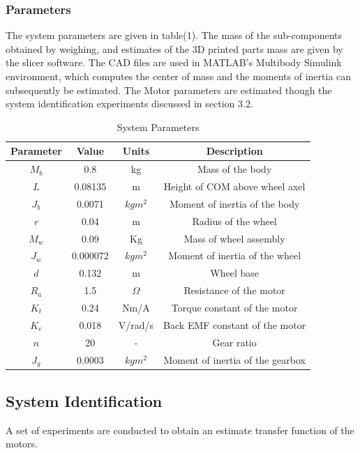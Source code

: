         \subsubsection{Parameters }
        The system parameters are given in table(1). 
        The mass of the sub-components obtained by weighing,
        and estimates of the 3D printed parts mass are given by the slicer software. 
        The CAD files are used in MATLAB's Multibody Simulink environment, which 
        computes the center of mass and the moments of inertia can subsequently be estimated.
        The Motor parameters are estimated though the system identification experiments discussed in section 3.2.
    
        \begin{table} [H]
            \centering
            \begin{tabular}{|c|c|c|c|}
                \hline
                Parameter & Value & Units & Description \\
                \hline
                $M_b$ & 0.8 & kg & Mass of the body \\
                $L$ & 0.08135 & m & Height of COM above wheel axel \\
                $J_b$ & 0.0071& $kgm^2$ & Moment of inertia of the body \\
                $r$ & 0.04 & m & Radius of the wheel \\
                $M_w$ & 0.09 & Kg & Mass of wheel assembly \\
                $J_w$ & 0.000072 & $kgm^2$ & Moment of inertia of the wheel \\
                $d$ & 0.132 & m & Wheel base \\
                $R_a$ & 1.5 & $\Omega$ & Resistance of the motor \\
                $K_t$ & 0.24 & Nm/A & Torque constant of the motor \\
                $K_e$ & 0.018 & V/rad/s & Back EMF constant of the motor \\
                $n$ & 20 & - & Gear ratio \\
                $J_g$ & 0.0003 & $kgm^2$ & Moment of inertia of the gearbox \\
                \hline
            \end{tabular}
            \caption{System Parameters}
        \end{table}

        \subsection{System Identification}
        A set of experiments are conducted to obtain an estimate transfer function of the motors.

